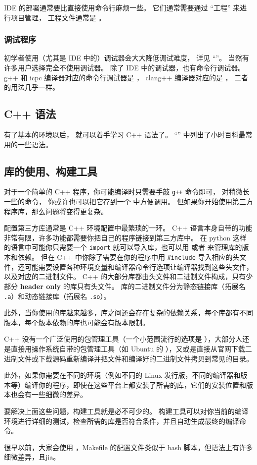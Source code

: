 IDE 的部署通常要比直接使用命令行麻烦一些。 它们通常需要通过 “工程” 来进行项目管理， 工程文件通常是 。

\subsubsection{调试程序}
初学者使用（尤其是 IDE 中的）调试器会大大降低调试难度， 详见 “”。 当然有许多用户选择完全不使用调试器。 除了 IDE 中的调试器，也有命令行调试器。 g++ 和 icpc 编译器对应的命令行调试器是 ， clang++ 编译器对应的是 ， 二者的用法几乎一样。

\subsection{C++ 语法}
有了基本的环境以后， 就可以着手学习 C++ 语法了。 “” 中列出了小时百科最常用的一些语法。

\subsection{库的使用、构建工具}
对于一个简单的 C++ 程序，你可能编译时只需要手敲 \verb`g++` 命令即可， 对稍微长一些的命令， 你或许也可以把它存到一个 中方便调用。 但如果你开始使用第三方程序库，那么问题将变得更复杂。

配置第三方库通常是 C++ 环境配置中最繁琐的一环。 C++ 语言本身自带的功能非常有限，许多功能都需要你把自己的程序链接到第三方库中。 在 python 这样的语言中可能你只需要一个 \verb`import` 就可以导入库，也可以用  或者  来管理库的版本和依赖。 但在 C++ 中你除了需要在你的程序中用 \verb`#include` 导入相应的头文件，还可能需要设置各种环境变量和编译器命令行选项让编译器找到这些头文件，以及对应的二进制文件。 C++ 的大部分库都由头文件和二进制文件构成，只有少部分 \textbf{header only} 的库只有头文件。 库的二进制文件分为静态链接库（拓展名 \verb`.a`）和动态链接库（拓展名 \verb`.so`）。

此外，当你使用的库越来越多，库之间还会存在复杂的依赖关系，每个库都有不同版本，每个版本依赖的库也可能会有版本限制。

C++ 没有一个广泛使用的包管理工具（一个小范围流行的选项是 ），大部分人还是直接用操作系统自带的包管理工具（如 Ubuntu 的 ），又或是直接从官网下载二进制文件或下载源码重新编译并把文件和编译好的二进制文件拷贝到常见的目录。

此外，如果你需要在不同的环境（例如不同的 Linux 发行版，不同的编译器和版本等）编译你的程序，即使在这些平台上都安装了所需的库，它们的安装位置和版本也会有一些细微的差异。

要解决上面这些问题，构建工具就是必不可少的。 构建工具可以对你当前的编译环境进行详细的测试，检查所需的库是否符合条件，并且自动生成最终的编译命令。

很早以前，大家会使用 ，Makefile 的配置文件类似于 bash 脚本，但语法上有许多细微差异，且jia。

